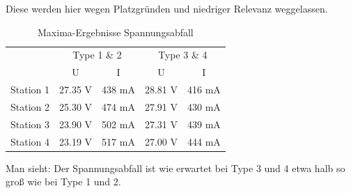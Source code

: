 Diese werden hier wegen Platzgründen und niedriger Relevanz weggelassen.
\begin{table}[H]
	\centering
	\begin{tabular}{|r|c|c|c|c|}
		\hline
		&\multicolumn{2}{c|}{Type 1 \& 2}&\multicolumn{2}{c|}{Type 3 \& 4}\\\cline{2-5}
		&U&I&U&I\\
		\midrule
		Station 1&27.35 V&438 mA&28.81 V&416 mA\\\hline
		Station 2&25.30 V&474 mA&27.91 V&430 mA\\\hline
		Station 3&23.90 V&502 mA&27.31 V&439 mA\\\hline
		Station 4&23.19 V&517 mA&27.00 V&444 mA\\
		\hline
	\end{tabular}
	\caption{Maxima-Ergebnisse Spannungsabfall}
\end{table}
Man sieht: Der Spannungsabfall ist wie erwartet bei Type 3 und 4 etwa halb so groß wie bei Type 1 und 2.
